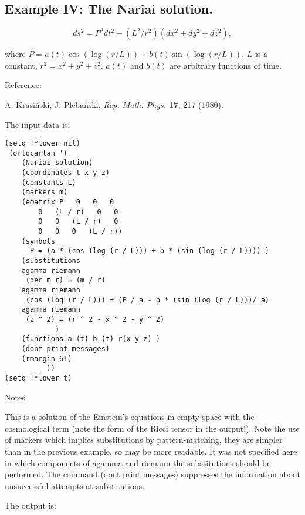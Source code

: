 \subsection{Example IV: The Nariai solution.}

$$ ds^2 = P^2 dt^2 - (L^2/r^2) (dx^2 + dy^2 + dz^2), $$

\noindent where $P = a (t) \cos (\log (r / L)) + b (t) \sin (\log (r / L))$,
$L$ is a constant, $r^2 = x^2 + y^2 + z^2$, $a(t)$ and $b(t)$ are arbitrary
functions of time.

\bigskip

\centerline{Reference:}

A. Krasi\'nski, J. Pleba\'nski, {\it Rep. Math. Phys.} {\bf 17}, 217 (1980).

The input data is:

\bigskip

\begin{verbatim}
(setq !*lower nil)
 (ortocartan '(
    (Nariai solution)
    (coordinates t x y z)
    (constants L)
    (markers m)
    (ematrix P   0   0   0
        0   (L / r)   0   0
        0   0   (L / r)   0
        0   0   0   (L / r))
    (symbols
      P = (a * (cos (log (r / L))) + b * (sin (log (r / L)))) )
    (substitutions
    agamma riemann
     (der m r) = (m / r)
    agamma riemann
     (cos (log (r / L))) = (P / a - b * (sin (log (r / L)))/ a)
    agamma riemann
     (z ^ 2) = (r ^ 2 - x ^ 2 - y ^ 2)
            )
    (functions a (t) b (t) r(x y z) )
    (dont print messages)
    (rmargin 61)
          ))
(setq !*lower t)
\end{verbatim}

\bigskip

\centerline{Notes}

This is a solution of the Einstein's equations in empty
     space  with  the cosmological term (note  the  form  of  the
     Ricci tensor in the output!). Note the use of markers  which
     implies substitutions by pattern-matching, they are  simpler
     than in the previous example, so may be  more  readable.  It
     was not specified here in which  components  of  agamma  and
     riemann the substitutions should be performed.  The  command
(dont print messages) suppresses the information about  unsuccessful attempts
at substitutions.

The output is:

\bigskip

